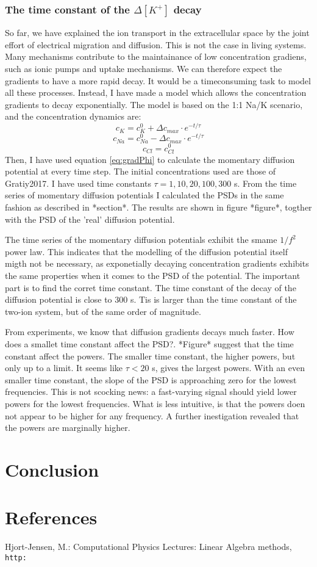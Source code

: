 \documentclass{article}
\begin{document}
\subsubsection{The time constant of the  $\Delta [K^+]$ decay}
So far, we have explained the ion transport in the extracellular space by the joint effort of electrical migration and diffusion. This is not the case in living systems. Many mechanisms contribute to the maintainance of low concentration gradiens, such as ionic pumps and uptake mechanisms. We can therefore expect the gradients to have a more rapid decay. It would be a timeconsuming task to model all these processes. Instead, I have made a model which allows the concentration gradients to decay exponentially. The model is based on the 1:1 Na/K scenario, and the concentration dynamics are:
$$
c_{K} = c_{K}^0 +\Delta c_{max} \cdot e^{-t/\tau}
$$
$$
c_{Na} = c_{Na}^0 -\Delta c_{max} \cdot e^{-t/\tau}
$$
$$
c_{Cl} = c_{Cl}^0
$$
Then, I have used equation \ref{eq:gradPhi} to calculate the momentary diffusion potential at every time step. The initial concentrations used are those of Gratiy2017. I have used time constants $\tau = 1,10,20,100,300$ s. From the time series of momentary diffusion potentials I calculated the PSDs in the same fashion as described in *section*. The results are shown in figure *figure*, togther with the PSD of the 'real' diffusion potential. 

The time series of the momentary diffusion potentials exhibit the smame $1/f^2$ power law. This indicates that the modelling of the diffusion potential itself migth not be necessary, as exponetially decaying concentration gradients exhibits the same properties when it comes to the PSD of the potential. The important part is to find the corret time constant. The time constant of the decay of the diffusion potential is close to 300 s. Tis is larger than the time constant of the two-ion system, but of the same order of magnitude.

From experiments, we know that diffusion gradients decays much faster. How does a smallet time constant affect the PSD?. *Figure* suggest that the time constant affect the powers. The smaller time constant, the higher powers, but only up to a limit. It seems like $\tau<20 $ s, gives the largest powers. With an even smaller time constant, the slope of the PSD is approaching zero for the lowest frequencies. This is not scocking news: a fast-varying signal should yield lower powers for the lowest frequencies. What is less intuitive, is that the powers doen not appear to be higher for any frequency. A further inestigation revealed that the powers are marginally higher. 
\section{Conclusion}

\section{References}

\begin{thebibliography}{1}
Hjort-Jensen, M.: Computational Physics Lectures: Linear
Algebra methods,
\\\texttt{http:}
\end{thebibliography}
\end{document}
